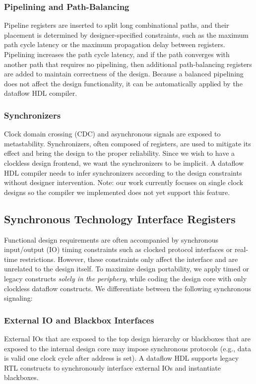 \subsubsection{Pipelining and Path-Balancing}
Pipeline registers are inserted to split long combinational paths, and their placement is determined by designer-specified constraints, such as the maximum path cycle latency or the maximum propagation delay between registers. Pipelining increases the path cycle latency, and if the path converges with another path that requires no pipelining, then additional path-balancing registers are added to maintain correctness of the design. Because a balanced pipelining does not affect the design functionality, it can be automatically applied by the dataflow HDL compiler.   
\subsubsection{Synchronizers}
Clock domain crossing (CDC) and asynchronous signals are exposed to metastability. Synchronizers, often composed of registers, are used to mitigate its effect and bring the design to the proper reliability. Since we wish to have a clockless design frontend, we want the synchronizers to be implicit. A dataflow HDL compiler needs to infer synchronizers according to the design constraints without designer intervention. Note: our work currently focuses on single clock designs so the compiler we implemented does not yet support this feature.

\subsection{Synchronous Technology Interface Registers}
\label{sec:sync}
Functional design requirements are often accompanied by synchronous input/output (IO) timing constraints such as clocked protocol interfaces or real-time restrictions. However, these constraints only affect the interface and are unrelated to the design itself. To maximize design portability, we apply timed or legacy constructs \emph{solely in the periphery}, while coding the design core with only clockless dataflow constructs. We differentiate between the following synchronous signaling:
\subsubsection{External IO and Blackbox Interfaces}
External IOs that are exposed to the top design hierarchy or blackboxes that are exposed to the internal design core may impose synchronous protocols (e.g., data is valid one clock cycle after address is set). A dataflow HDL supports legacy RTL constructs to synchronously interface external IOs and instantiate blackboxes. 
